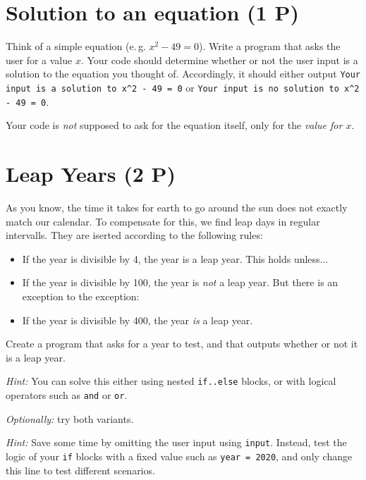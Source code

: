 \documentclass[
	english,
	fontsize=10pt,
	parskip=half,
	titlepage=true,
	DIV=12
]{scrartcl}
\newcommand*{\inPy}[1]{\texttt{#1}}
\newcommand*{\eg}{e.\,g. }
\begin{document}
\section{Solution to an equation (1 P)}
Think of a simple equation (\eg $x^2 - 49 = 0$). 
Write a program that asks the user for a value $x$. Your code should determine whether or not the user input is a solution to the equation you thought of. Accordingly, it should either output \texttt{Your input is a solution to x\textasciicircum 2 - 49 = 0} or \texttt{Your input is no solution to x\textasciicircum 2 - 49 = 0}.

Your code is \emph{not} supposed to ask for the equation itself, only for the \emph{value for $x$}.

\section{Leap Years (2 P)}
As you know, the time it takes for earth to go around the sun does not exactly match our calendar. To compensate for this, we find leap days in regular intervalls. They are iserted according to the following rules:

\begin{itemize}
  \item If the year is divisible by 4, the year is a leap year. This holds unless...
  \item If the year is divisible by 100, the year is \emph{not} a leap year. But there is an exception to the exception:
  \item If the year is divisible by 400, the year \emph{is} a leap year.
\end{itemize}
Create a program that asks for a year to test, and that outputs whether or not it is a leap year.

\emph{Hint:} You can solve this either using nested \inPy{if..else} blocks, or with logical operators such as \inPy{and} or \inPy{or}.

\emph{Optionally:} try both variants.

\emph{Hint:} Save some time by omitting the user input using \inPy{input}. Instead, test the logic of your \inPy{if} blocks with a fixed value such as 
\inPy{year = 2020}, and only change this line to test different scenarios.
\end{document}
